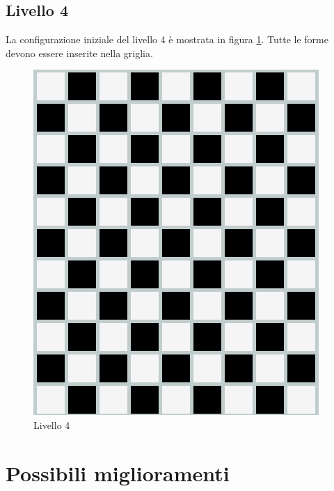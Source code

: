 \subsection{Livello 4}
La configurazione iniziale del livello 4 è mostrata in figura \ref{lev4}. Tutte le forme devono essere inserite nella griglia.
\begin{figure}[h]
	\centering
	\includegraphics[scale=0.3]{immagini/lv4}
	\caption{Livello 4}
	\label{lev4}
\end{figure}


\section{Possibili miglioramenti}